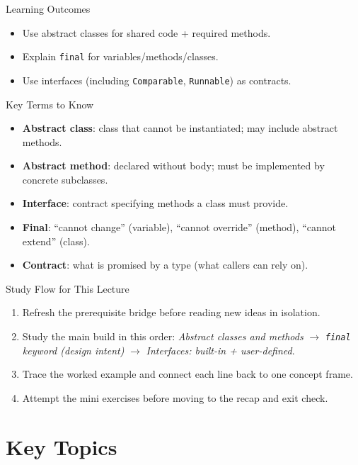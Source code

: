 \documentclass{beamer}
\begin{document}
\begin{frame}{Learning Outcomes}
  \begin{itemize}[<+->]
    \item Use abstract classes for shared code + required methods.
    \item Explain \texttt{final} for variables/methods/classes.
    \item Use interfaces (including \texttt{Comparable}, \texttt{Runnable}) as contracts.
  \end{itemize}
  \slidesources{\OOPSUnitIISources}
\end{frame}

\begin{frame}{Key Terms to Know}
\begin{itemize}[<+->]
  \item \textbf{Abstract class}: class that cannot be instantiated; may include abstract methods.
  \item \textbf{Abstract method}: declared without body; must be implemented by concrete subclasses.
  \item \textbf{Interface}: contract specifying methods a class must provide.
  \item \textbf{Final}: ``cannot change'' (variable), ``cannot override'' (method), ``cannot extend'' (class).
  \item \textbf{Contract}: what is promised by a type (what callers can rely on).
\end{itemize}
  \slidesources{\OOPSUnitIISources}
\end{frame}

\begin{frame}{Study Flow for This Lecture}
\begin{enumerate}[<+->]
  \item Refresh the prerequisite bridge before reading new ideas in isolation.
  \item Study the main build in this order: \textit{Abstract classes and methods} $\rightarrow$ \textit{\texttt{final} keyword (design intent)} $\rightarrow$ \textit{Interfaces: built-in + user-defined}.
  \item Trace the worked example and connect each line back to one concept frame.
  \item Attempt the mini exercises before moving to the recap and exit check.
\end{enumerate}
  \slidesources{\OOPSUnitIISources}
\end{frame}


\section{Key Topics}
\label{sec:concepts}
\end{document}
